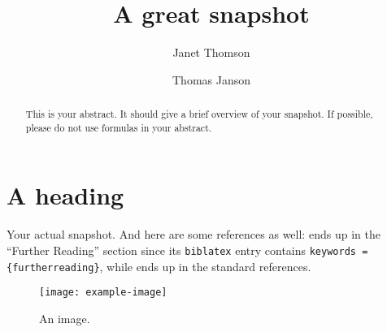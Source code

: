 \documentclass{snapshotmfo}
\author{Janet Thomson \and Thomas Janson}
\title{A great snapshot}
\begin{document}
\begin{abstract}
This is your abstract. It should give a brief overview of your snapshot. If possible, please do not use formulas in your abstract.
\end{abstract}

\section{A heading}
Your actual snapshot. And here are some references as well: \cite{knuth1977fast} ends up in the \enquote{Further Reading} section since its \texttt{biblatex} entry contains \verb!keywords = {furtherreading}!, while \cite{knuth1986texbook} ends up in the standard references.

\begin{figure}[h]
        \centering \texttt{[image: example-image]}
        \caption{An image.}
\label{fig:moon}
\end{figure}
\end{document}
